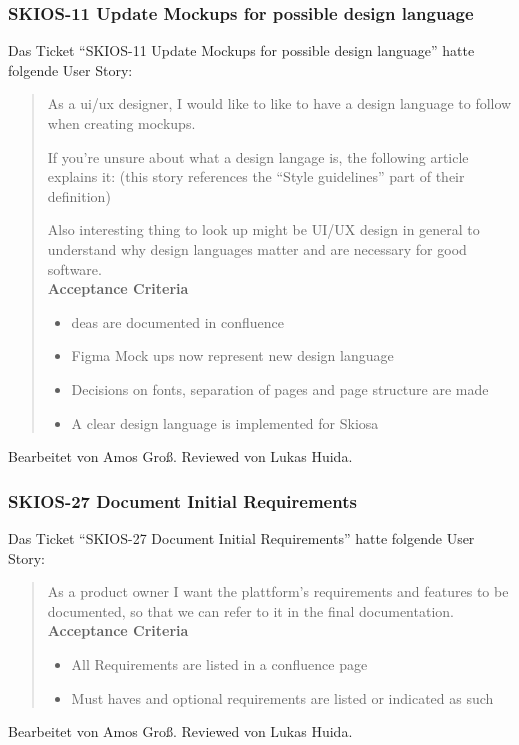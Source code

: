 \subsubsection{SKIOS-11 Update Mockups for possible design language}
Das Ticket \enquote{SKIOS-11 Update Mockups for possible design language} hatte folgende User Story:
\begin{quotation}
    As a ui/ux designer, I would like to like to have a design language to follow when creating mockups.

    If you’re unsure about what a design langage is, the following article explains it:  (this story references the “Style guidelines” part of their definition)

    Also interesting thing to look up might be UI/UX design in general to understand why design languages matter and are necessary for good software. \\
\textbf{Acceptance Criteria}
\begin{itemize}
    \item deas are documented in confluence
    \item Figma Mock ups now represent new design language
    \item Decisions on fonts, separation of pages and page structure are made
    \item A clear design language is implemented for Skiosa
\end{itemize}
\end{quotation}
Bearbeitet von Amos Groß.
Reviewed von Lukas Huida.

\subsubsection{SKIOS-27 Document Initial Requirements}
Das Ticket \enquote{SKIOS-27 Document Initial Requirements} hatte folgende User Story:
\begin{quotation}
    As a product owner I want the plattform's requirements and features to be documented, so that we can refer to it in the final documentation. \\
\textbf{Acceptance Criteria}
\begin{itemize}
    \item All Requirements are listed in a confluence page
    \item Must haves and optional requirements are listed or indicated as such
\end{itemize}
\end{quotation}
Bearbeitet von Amos Groß.
Reviewed von Lukas Huida.

